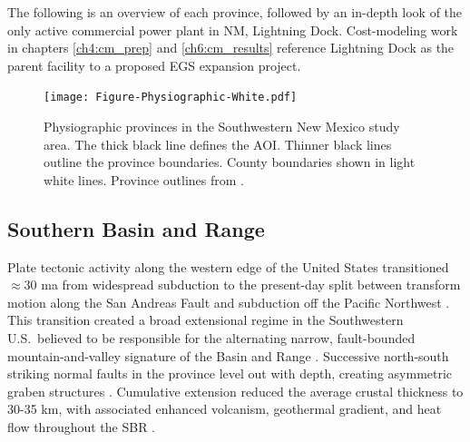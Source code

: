 The following is an overview of each province, followed by an in-depth look of the only active commercial power plant in NM, Lightning Dock. Cost-modeling work in chapters \ref{ch4:cm_prep} and \ref{ch6:cm_results} reference Lightning Dock as the parent facility to a proposed EGS expansion project.

\begin{figure}
\centering
\texttt{[image: Figure-Physiographic-White.pdf]}
\caption[Physiographic provinces of Southwestern New Mexico]{Physiographic provinces in the Southwestern New Mexico study area. The thick black line defines the AOI. Thinner black lines outline the province boundaries. County boundaries shown in light white lines. Province outlines from \protect\citep[~Figure 2-2]{bielicki_hydrogeolgic_2015}.}
\label{fig:phys-provinces}
\end{figure}

\subsection{Southern Basin and Range}\label{ch2:sbr_province}
Plate tectonic activity along the western edge of the United States transitioned $\approx$30 \acrshort{ma} from widespread subduction to the present-day split between transform motion along the San Andreas Fault and subduction off the Pacific Northwest \citep[p.\ 81]{fowler_solid_2005}. This transition created a broad extensional regime in the Southwestern U.S.\ believed to be responsible for the alternating narrow, fault-bounded mountain-and-valley signature of the Basin and Range \citep{henry_real_1992}. Successive north-south striking normal faults in the province level out with depth, creating asymmetric graben structures \citep[p.\ 28-29]{frisch_continental_2011}. Cumulative extension reduced the average crustal thickness to 30-35 km, with associated enhanced volcanism, geothermal gradient, and heat flow throughout the SBR \citep{lerch_crustal_2007}.

